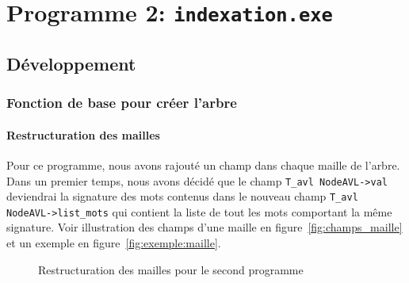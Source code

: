 \documentclass{article} %
\begin{document}
\section{Programme 2: \texttt{indexation.exe} \label{sec:prog_2}}
\subsection{Développement}

\subsubsection{Fonction de base pour créer l'arbre}
\paragraph{Restructuration des mailles} Pour ce programme, nous avons rajouté un champ dans chaque maille de l'arbre. Dans un premier temps, nous avons décidé que le champ \texttt{T\_avl NodeAVL->val} deviendrai la signature des mots contenus dans le nouveau champ \texttt{T\_avl NodeAVL->list\_mots} qui contient la liste de tout les mots comportant la même signature. Voir illustration des champs d'une maille en figure~\ref{fig:champs_maille} et un exemple en figure~\ref{fig:exemple:maille}.

\begin{figure}[H]
  \begin{center}
  \end{center}
  \caption{Restructuration des mailles pour le second programme}
  \label{fig:restruc_pro2}
\end{figure}
\end{document}
